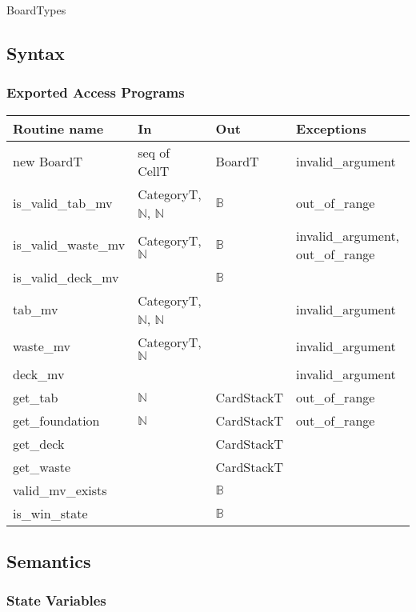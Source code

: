 \documentclass[12pt]{article}
\begin{document}
\noindent BoardTypes

\subsection* {Syntax}



\subsubsection* {Exported Access Programs}

\begin{tabular}{| l | l | l | l |}
\hline
\textbf{Routine name} & \textbf{In} & \textbf{Out} & \textbf{Exceptions}\\
\hline
new BoardT  & seq of CellT & BoardT & invalid\_argument\\
\hline
is\_valid\_tab\_mv & CategoryT, $\mathbb{N}$, $\mathbb{N}$ & $\mathbb{B}$ & out\_of\_range\\
\hline
is\_valid\_waste\_mv & CategoryT, $\mathbb{N}$ & $\mathbb{B}$ &
                                                                invalid\_argument, out\_of\_range\\
\hline
is\_valid\_deck\_mv &  &  $\mathbb{B}$ & \\
\hline
tab\_mv & CategoryT, $\mathbb{N}$, $\mathbb{N}$ & & invalid\_argument\\
\hline
waste\_mv & CategoryT, $\mathbb{N}$ & & invalid\_argument\\
\hline
deck\_mv &  & & invalid\_argument\\
\hline
get\_tab & $\mathbb{N}$ & CardStackT & out\_of\_range\\
\hline
get\_foundation & $\mathbb{N}$ & CardStackT & out\_of\_range\\
\hline
get\_deck &  & CardStackT & \\
\hline
get\_waste &  & CardStackT & \\
\hline
valid\_mv\_exists & & $\mathbb{B}$ &\\
\hline
is\_win\_state & & $\mathbb{B}$ & \\
\hline
\end{tabular}

\subsection* {Semantics}

\subsubsection* {State Variables}
\end{document}
